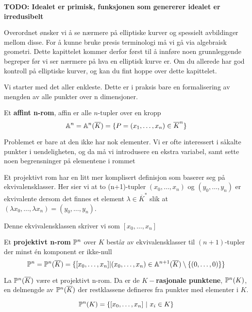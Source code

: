 \textbf{TODO: Idealet er primisk, funksjonen som genererer idealet er irredusibelt}

Overordnet ønsker vi å se nærmere på elliptiske kurver og spessielt avbildinger mellom disse. For å kunne bruke presis terminologi må vi gå via algebraisk geometri. Dette kapittelet kommer derfor først til å innføre noen grunnleggende begreper før vi ser nærmere på hva en elliptisk kurve er. Om du allerede har god kontroll på elliptiske kurver, og kan du fint hoppe over dette kapittelet.



Vi starter med det aller enkleste. Dette er i praksis bare en formalisering av mengden av alle punkter over n dimensjoner.
\begin{definisjon}
Et \textbf{affint n-rom}, \gls{affin} er alle $n$-tupler over en kropp $$\mathbb{A} ^n = \mathbb{A}^n(\overline{K}) = \{P = (x_1, \ldots, x_n ) \in \overline{K}^n \}$$
\end{definisjon}

Problemet er bare at den ikke har nok elementer. Vi er ofte interessert i såkalte punkter i uendeligheten, og da må vi introdusere en ekstra variabel, samt sette noen begrensninger på elementene i rommet

Et projektivt rom har en litt mer komplisert definisjon som baserer seg på ekvivalensklasser. Her sier vi at to (n+1)-tupler $(x_0, \ldots, x_n)$ og $(y_0, \ldots, y_n)$ er ekvivalente dersom det finnes et element $\lambda \in \overline{K}^*$ slik at $(\lambda x_0, \ldots, \lambda x_n) = (y_0, \ldots, y_n)$.

Denne ekvivalensklassen skriver vi som $[x_0, \ldots, x_n]$
\begin{definisjon}
    Et \textbf{projektivt n-rom} $\mathbb{P}^n$ over $K$ består av ekvivalensklasser til $(n+1)$-tupler der minst én komponent er ikke-null $$\mathbb{P}^n = \mathbb{P}^n(\overline{K}) = \{[x_0, \ldots, x_n] | (x_0, \ldots, x_n) \in \mathbb{A} ^{n+1}(\overline{K}) \setminus \{(0, \ldots, 0)\} \}$$
\end{definisjon}

\begin{definisjon}
La $\mathbb{P}^n(\overline{K})$ være et projektivt n-rom. Da er de \textbf{$K-$rasjonale punktene}, $\mathbb{P}^n(K)$, en delmengde av $\mathbb{P}^n(\overline{K})$ der restklassene defineres fra punkter med elementer i $K$. 

$$\mathbb{P}^n(K) = \{[x_0, \ldots, x_n] \text{ $|$ } x_i \in K \} $$
\end{definisjon}

